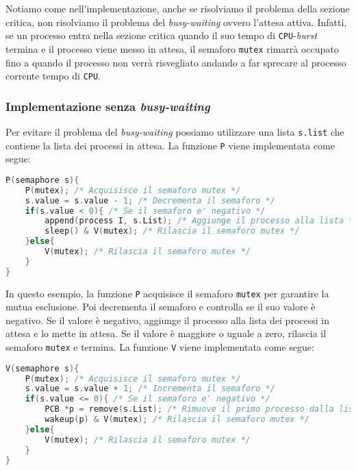         Notiamo come nell'implementazione, anche se risolviamo il problema della sezione critica, non risolviamo il problema del \textit{busy-waiting} ovvero l'attesa attiva. Infatti, se un processo entra nella sezione critica quando il suo tempo di \texttt{CPU}-\textit{burst} termina e il processo viene messo in attesa, il semaforo \texttt{mutex} rimarrà occupato fino a quando il processo non verrà risvegliato andando a far sprecare al processo corrente tempo di \texttt{CPU}.
    \subsubsection{Implementazione senza \textit{busy-waiting}}
        Per evitare il problema del \textit{busy-waiting} possiamo utilizzare una lista \texttt{s.list} che contiene la lista dei processi in attesa. La funzione \texttt{P} viene implementata come segue:
        \begin{lstlisting}[language=C++,basicstyle=\footnotesize]
P(semaphore s){
    P(mutex); /* Acquisisce il semaforo mutex */
    s.value = s.value - 1; /* Decrementa il semaforo */
    if(s.value < 0){ /* Se il semaforo e' negativo */
        append(process I, s.List); /* Aggiunge il processo alla lista */
        sleep() & V(mutex); /* Rilascia il semaforo mutex */
    }else{
        V(mutex); /* Rilascia il semaforo mutex */
    }
}
        \end{lstlisting}
        In questo esempio, la funzione \texttt{P} acquisisce il semaforo \texttt{mutex} per garantire la mutua esclusione. Poi decrementa il semaforo e controlla se il suo valore è negativo. Se il valore è negativo, aggiunge il processo alla lista dei processi in attesa e lo mette in attesa. Se il valore è maggiore o uguale a zero, rilascia il semaforo \texttt{mutex} e termina. La funzione \texttt{V} viene implementata come segue:
        \begin{lstlisting}[language=C++,basicstyle=\footnotesize]
V(semaphore s){
    P(mutex); /* Acquisisce il semaforo mutex */
    s.value = s.value + 1; /* Incrementa il semaforo */
    if(s.value <= 0){ /* Se il semaforo e' negativo */
        PCB *p = remove(s.List); /* Rimuove il primo processo dalla lista */
        wakeup(p) & V(mutex); /* Rilascia il semaforo mutex */
    }else{
        V(mutex); /* Rilascia il semaforo mutex */
    }
}
        \end{lstlisting}
